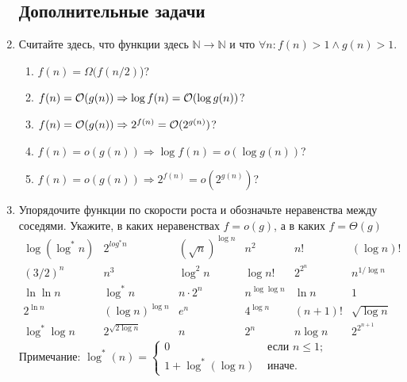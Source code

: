 \begin{enumerate}
\subsection*{Дополнительные задачи}
    
    \item  
    Считайте здесь, что функции здесь $\mathbb{N} \to \mathbb{N}$ и что $\forall n : f(n) > 1 \land g(n) > 1$.
    \begin{enumerate}
      \item $f(n) = \Omega(f(n \slash 2)$)?
      \item $f(n) = \mathcal{O}(g(n)) \Rightarrow \log f(n) = \mathcal{O}(\log g(n))$?
      \item $f(n) = \mathcal{O}(g(n)) \Rightarrow 2^{f(n)} = \mathcal{O}(2^{g(n)})$?
      \item $f(n) = o(g(n)) \Rightarrow \log f(n) = o(\log g(n))$?
      \item $f(n) = o(g(n)) \Rightarrow 2^{f(n)} = o(2^{g(n)})$?
    \end{enumerate}
    
	\item
	Упорядочите функции по скорости роста и обозначьте неравенства между соседями. 
	Укажите, в каких неравенствах $f = o(g)$, а в каких $f = \Theta(g)$
	$$
	\begin{array}{cccccc}
	\log(\log^* n) & 2^{log^* n} & (\sqrt{n})^{\log n} & n^2 & n! & (\log n)! \\
	(3 \slash 2)^n & n^3 & \log^2 n & \log n! & 2^{2^n} & n^{1 \slash \log n} \\
	\ln \ln n & \log^* n & n \cdot 2^n & n^{\log \log n} & \ln n & 1 \\
	2^{\ln n} & (\log n)^{\log n} & e^n & 4^{\log n} & (n + 1)! & \sqrt{\log n} \\
	\log^* \log n & 2^{\sqrt{2 \log n}} & n & 2^n & n \log n & 2^{2^{n + 1}}					
	\end{array}
	$$
	Примечание: $\log^*(n) = \left\{
	\begin{array}{ll}
	0 & \texttt{ если } n \leq 1;\\
	1 + \log^*(\log n) & \texttt{ иначе.}
	\end{array}
	\right.$
\end{enumerate}

\clearpage
